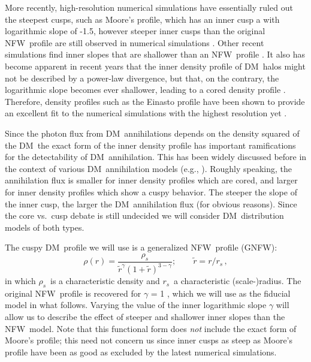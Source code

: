 \documentclass[aps,prd,twocolumn,amsmath,amssymb,floatfix,nofootinbib,10pt]{revtex4}
\newcommand{\eg}{e.g.}
\newcommand{\NFW}{NFW}
\newcommand{\GNFW}{G\NFW}
\newcommand{\DM}{DM}
\newcommand{\redr}{\ensuremath{\tilde{r}}}
\newcommand{\rhos}{\ensuremath{\rho_s}}
\newcommand{\rs}{\ensuremath{r_s}}
\begin{document}
More recently, high-resolution numerical simulations have essentially
ruled out the steepest cusps, such as Moore's profile, which has an
inner cusp a with logarithmic slope of -1.5, however steeper inner
cusps than the original \NFW\ profile are still observed in numerical
simulations \cite{2005MNRAS.364..665D}. Other recent simulations find
inner slopes that are shallower than an \NFW\ profile
\cite{2008MNRAS.385..545K,2008arXiv0808.2981S,2008arXiv0810.1522N}. It
also has become apparent in recent years that the inner density
profile of \DM\ halos might not be described by a power-law
divergence, but that, on the contrary, the logarithmic slope becomes
ever shallower, leading to a cored density profile
\cite{2004MNRAS.349.1039N,2005ApJ...624L..85M,2006AJ....132.2685M,2006AJ....132.2701G,2006MNRAS.365..147S,2008arXiv0808.2981S,2008MNRAS.391.1685S,2008arXiv0810.1522N}. Therefore,
density profiles such as the Einasto profile
\cite{einasto65a,1989A&A...223...89E} have been shown to provide an
excellent fit to the numerical simulations with the highest resolution
yet \cite{2008MNRAS.391.1685S,2008arXiv0808.2981S}.

Since the photon flux from \DM\ annihilations depends on the density
squared of the \DM\, the exact form of the inner density profile has
important ramifications for the detectability of \DM\
annihilation. This has been widely discussed before in the context of
various \DM\ annihilation models (\eg,
\cite{1998APh.....9..137B,1999PhRvL..83.1719G,2000PhRvD..62l3005C,2000PhLB..494..181G,2002PhRvD..66b3509T,2002PhRvD..66l3502U,2003MNRAS.339..505T,2004ApJ...601...47A,2008JCAP...07..013B,2008arXiv0811.3744B,2008arXiv0812.3895B}). Roughly
speaking, the annihilation flux is smaller for inner density profiles
which are cored, and larger for inner density profiles which show a
cuspy behavior. The steeper the slope of the inner cusp, the larger
the \DM\ annihilation flux (for obvious reasons). Since the core
vs.~cusp debate is still undecided we will consider \DM\ distribution
models of both types.

The cuspy \DM\ profile we will use is a generalized \NFW\ profile (\GNFW):
\begin{equation}\label{eq:NFW}
\rho(r) = \frac{\rhos}{\redr^\gamma\left(1+\redr\right)^{3-\gamma}};\qquad \redr = r/\rs\, ,
\end{equation}
in which \rhos\ is a characteristic density and \rs\ a characteristic
(scale-)radius.  The original \NFW\ profile is recovered for $\gamma$
= 1 \cite{1997ApJ...490..493N}, which we will use as the fiducial
model in what follows. Varying the value of the inner logarithmic
slope $\gamma$ will allow us to describe the effect of steeper and
shallower inner slopes than the \NFW\ model. Note that this functional
form does \emph{not} include the exact form of Moore's profile; this
need not concern us since inner cusps as steep as Moore's profile have
been as good as excluded by the latest numerical simulations.
\end{document}
